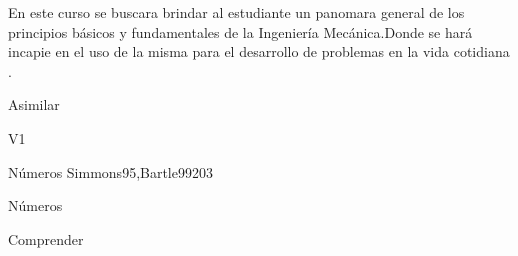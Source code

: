 \begin{syllabus}


\begin{justification}
En este curso se buscara brindar al estudiante un panomara general de los principios básicos y fundamentales  de la Ingeniería Mecánica.Donde se hará incapie en el uso de la misma para el desarrollo de problemas en la vida cotidiana . \end{justification}

\begin{goals}
\item Asimilar
\end{goals}

\begin{outcomes}{V1}
   \item {}
   \item {}
   \item {}
\end{outcomes}

\begin{unit}{Números }{}{Simmons95,Bartle99}{20}{3}
   \begin{topics}
      \item Números 
   \end{topics}

   \begin{learningoutcomes}
      \item Comprender 
      \end{learningoutcomes}
\end{unit}

\begin{coursebibliography}
\end{coursebibliography}

\end{syllabus}
